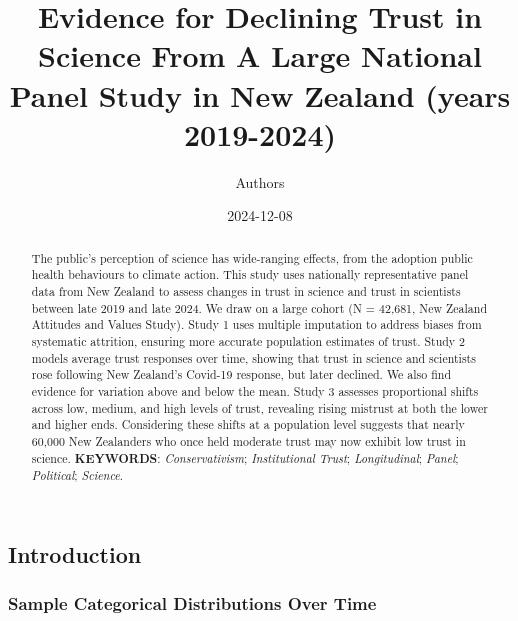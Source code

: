 \documentclass[
  single column]{article}
\title{Evidence for Declining Trust in Science From A Large National
Panel Study in New Zealand (years 2019-2024)}
\author{Authors}
\affil{%
             \small{     New Zealand
          ORCID \textcolor[HTML]{A6CE39}{\aiOrcid} ~0000-0003-3169-6576 }
              }
\date{2024-12-08}
\begin{document}
\maketitle
\begin{abstract}
The public's perception of science has wide-ranging effects, from the
adoption public health behaviours to climate action. This study uses
nationally representative panel data from New Zealand to assess changes
in trust in science and trust in scientists between late 2019 and late
2024. We draw on a large cohort (N = 42,681, New Zealand Attitudes and
Values Study). Study 1 uses multiple imputation to address biases from
systematic attrition, ensuring more accurate population estimates of
trust. Study 2 models average trust responses over time, showing that
trust in science and scientists rose following New Zealand's Covid-19
response, but later declined. We also find evidence for variation above
and below the mean. Study 3 assesses proportional shifts across low,
medium, and high levels of trust, revealing rising mistrust at both the
lower and higher ends. Considering these shifts at a population level
suggests that nearly 60,000 New Zealanders who once held moderate trust
may now exhibit low trust in science. \textbf{KEYWORDS}:
\emph{Conservativism}; \emph{Institutional Trust}; \emph{Longitudinal};
\emph{Panel}; \emph{Political}; \emph{Science}.
\end{abstract}


\subsection{Introduction}\label{introduction}

\subsubsection{Sample Categorical Distributions Over
Time}\label{sample-categorical-distributions-over-time}
\end{document}
